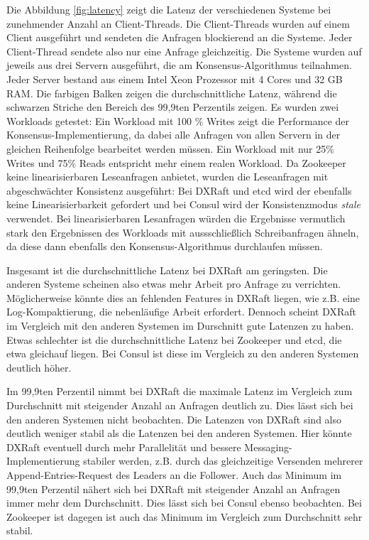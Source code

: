 Die Abbildung \ref{fig:latency} zeigt die Latenz der verschiedenen Systeme bei zunehmender Anzahl an Client-Threads. Die Client-Threads wurden auf einem Client ausgeführt und sendeten die Anfragen blockierend an die Systeme. Jeder Client-Thread sendete also nur eine Anfrage gleichzeitig. Die Systeme wurden auf jeweils aus drei Servern ausgeführt, die am Konsensus-Algorithmus teilnahmen. Jeder Server bestand aus einem Intel Xeon Prozessor mit 4 Cores und 32 GB RAM. Die farbigen Balken zeigen die durchschnittliche Latenz, während die schwarzen Striche den Bereich des 99,9ten Perzentils zeigen. Es wurden zwei Workloads getestet: Ein Workload mit 100 \% Writes zeigt die Performance der Konsensus-Implementierung, da dabei alle Anfragen von allen Servern in der gleichen Reihenfolge bearbeitet werden müssen. Ein Workload mit nur 25\% Writes und 75\% Reads entspricht mehr einem realen Workload. Da Zookeeper keine linearisierbaren Leseanfragen anbietet, wurden die Leseanfragen mit abgeschwächter Konsistenz ausgeführt: Bei DXRaft und etcd wird der ebenfalls keine Linearisierbarkeit gefordert und bei Consul wird der Konsistenzmodus \textit{stale} verwendet. Bei linearisierbaren Lesanfragen würden die Ergebnisse vermutlich stark den Ergebnissen des Workloads mit aussschließlich Schreibanfragen ähneln, da diese dann ebenfalls den Konsensus-Algorithmus durchlaufen müssen.

Insgesamt ist die durchschnittliche Latenz bei DXRaft am geringsten. Die anderen Systeme scheinen also etwas mehr Arbeit pro Anfrage zu verrichten. Möglicherweise könnte dies an fehlenden Features in DXRaft liegen, wie z.B. eine Log-Kompaktierung, die nebenläufige Arbeit erfordert. Dennoch scheint DXRaft im Vergleich mit den anderen Systemen im Durschnitt gute Latenzen zu haben. Etwas schlechter ist die durchschnittliche Latenz bei Zookeeper und etcd, die etwa gleichauf liegen. Bei Consul ist diese im Vergleich zu den anderen Systemen deutlich höher.

Im 99,9ten Perzentil nimmt bei DXRaft die maximale Latenz im Vergleich zum Durchschnitt mit steigender Anzahl an Anfragen deutlich zu. Dies lässt sich bei den anderen Systemen nicht beobachten. Die Latenzen von DXRaft sind also deutlich weniger stabil als die Latenzen bei den anderen Systemen. Hier könnte DXRaft eventuell durch mehr Parallelität und bessere Messaging-Implementierung stabiler werden, z.B. durch das gleichzeitige Versenden mehrerer Append-Entries-Request des Leaders an die Follower. Auch das Minimum im 99,9ten Perzentil nähert sich bei DXRaft mit steigender Anzahl an Anfragen immer mehr dem Durchschnitt. Dies lässt sich bei Consul ebenso beobachten. Bei Zookeeper ist dagegen ist auch das Minimum im Vergleich zum Durchschnitt sehr stabil.

